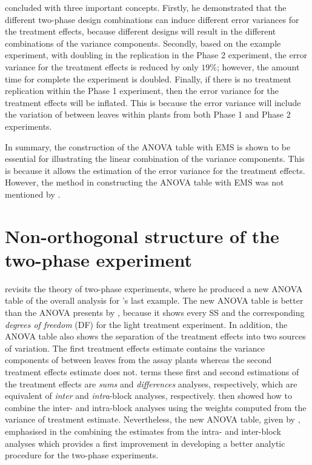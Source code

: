 \documentclass[11pt,a4paper]{article}
\begin{document}
\cite{McIntyre1955} concluded with three important concepts. Firstly, he demonstrated that the different two-phase design combinations can induce different error variances for the treatment effects, because different designs will result in the different combinations of the variance components. Secondly, based on the example experiment, with doubling in the replication in the Phase 2 experiment, the error variance for the treatment effects is reduced by only $19\%$; however, the amount time for complete the experiment is doubled. Finally, if there is no treatment replication within the Phase 1 experiment, then the error variance for the treatment effects will be inflated. This is because the error variance will include the variation of between leaves within plants from both Phase 1 and Phase 2 experiments. 

In summary, the construction of the ANOVA table with EMS is shown to be essential for illustrating the linear combination of the variance components. This is because it allows the estimation of the error variance for the treatment effects. However, the method in constructing the ANOVA table with EMS was not mentioned by \cite{McIntyre1955}.
 
\section{Non-orthogonal structure of the two-phase experiment}
\cite{Curnow1959} revisits the theory of two-phase experiments, where he produced a new ANOVA table of the overall analysis for \citeauthor{McIntyre1955}'s last example. The new ANOVA table is better than the ANOVA presents by \cite{McIntyre1955}, because it shows every SS and the corresponding \emph{degrees of freedom} (DF) for the light treatment experiment. In addition, the ANOVA table also shows the separation of the treatment effects into two sources of variation. The first  treatment effects estimate contains the variance components of between leaves from the assay plants whereas the second treatment effects estimate does not. \cite{Curnow1959} terms these first and second estimations of the treatment effects are \emph{sums} and \emph{differences} analyses, respectively, which are equivalent of \emph{inter} and \emph{intra}-block analyses, respectively. \cite{Curnow1959} then showed how to combine the inter- and intra-block analyses using the weights computed from the variance of treatment estimate. Nevertheless, the new ANOVA table, given by \cite{Curnow1959}, emphasised in the combining the estimates from the intra- and inter-block analyses which provides a first improvement in developing a better analytic procedure for the two-phase experiments. 
\end{document}
